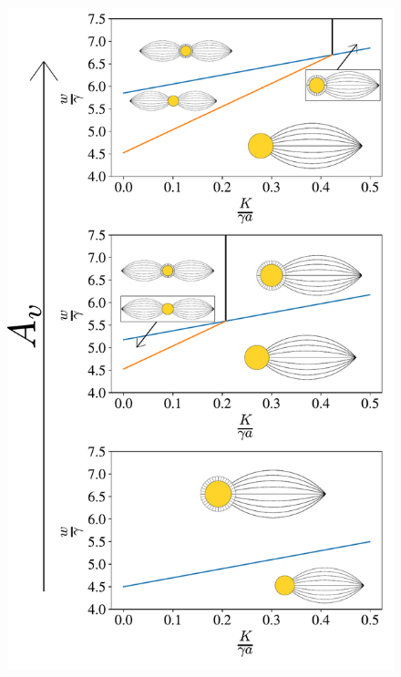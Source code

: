\documentclass[%
 aip,
 amsmath,amssymb,
 reprint,%
]{revtex4-1}
\begin{document}
\begin{figure}
\centering
\includegraphics[scale=0.48]{media/190821-fig6-v8.pdf}

\end{figure}
\end{document}
